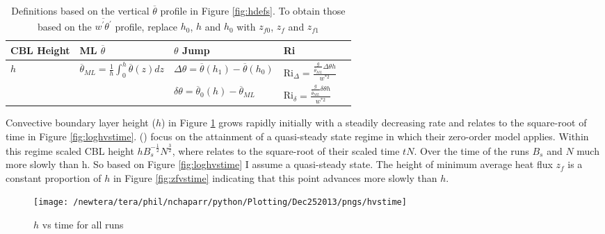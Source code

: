 \begin{table}[htbp]
    \begin{center}
    \begin{tabular}{ p{2cm} p{4cm}  p{3cm}  p{3cm} p{3cm} }
      \acs{CBL} Height & \acs{ML} $\overline{\theta}$ & $\theta$ Jump & \acs{Ri} \\ \hline 
       $h$ & $\overline{\theta}_{ML} = \frac{1}{h}\int^{h}_{0}\overline{\theta}(z)dz$ & $\Delta \theta=\overline{\theta}(h_{1})-\overline{\theta}(h_{0})$ & \acs{Ri}$_{\Delta}=\frac{\frac{g}{\overline{\theta}_{ML}}\Delta \theta h}{w^{*2}}$  \\ [.3cm] %
        
       & &$\delta \theta = \overline{\theta}_{0}(h)- \overline{\theta}_{ML}$ & \acs{Ri}$_{\delta}=\frac{\frac{g}{\overline{\theta}_{ML}} \delta \theta h}{w^{*2}}$ \\ \hline
      \end{tabular}
\caption[Height definitions]{Definitions based on the vertical $\overline{\theta}$ profile in Figure \ref{fig:hdefs}.  To obtain those based on the $\overline{w^{'}\theta^{'}}$ profile, replace $h_{0}$, $h$ and $h_{0}$ with $z_{f0}$, $z_{f}$ and $z_{f1}$}
\label{table:reldefs}   
\end{center}    
\end{table}

Convective boundary layer height ($h$) in Figure \ref{fig:hvstime} grows rapidly initially with a steadily decreasing rate and relates to the square-root of time in Figure \ref{fig:loghvstime}.  \citeauthor{FedConzMir04} (\citeyear{FedConzMir04})
focus on the attainment of a quasi-steady state regime in which their zero-order model applies.  Within this regime scaled \acs{CBL} height $hB_{s}^{-\frac{1}{2}}N^{\frac{3}{2}}$, where  relates to the square-root of their scaled time $tN$. Over the time of the runs $B_{s}$ and $N$
much more slowly than h.  So based on Figure \ref{fig:loghvstime} I assume a quasi-steady state. The height of minimum average heat flux $z_{f}$ is a constant proportion of $h$ in Figure \ref{fig:zfvstime} indicating that this point advances more slowly than $h$.\\
  
\begin{figure}[htbp]
    \centering
    \texttt{[image: /newtera/tera/phil/nchaparr/python/Plotting/Dec252013/pngs/hvstime]}
    \caption{$h$ vs time for all runs}
    \label{fig:hvstime}   %
\end{figure}

